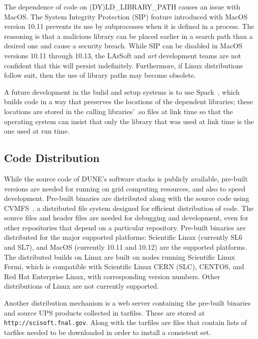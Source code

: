 The dependence of code on (DY)LD\_LIBRARY\_PATH causes an issue with MacOS.  The System Integrity Protection (SIP)
feature introduced with MacOS version 10.11 prevents its use by subprocesses when it is defined in a process.
The reasoning is that a malicious library can be placed earlier in a search path than a desired one and
cause a security breach.  While SIP can be disabled in MacOS versions 10.11 through 10.13, the LArSoft and
{\it art} development teams are not confident that this will persist indefinitely.  Furthermore, if Linux
distributions follow suit, then the use of library paths may become obsolete.

A future development in the bulid and setup systems is to use Spack~\cite{ref:spack}, which builds code in
a way that preserves the locations of the dependent libraries; these locations are stored in the calling
libraries' .so files at link time so that the operating system can insist that only the library that was used
at link time is the one used at run time.

\subsection{Code Distribution}

While the source code of DUNE's software stacks is publicly available, pre-built versions are needed
for running on grid computing resources, and also to speed development.  Pre-built binaries are distributed
along with the source code using CVMFS~\cite{ref:cvmfs}, a distributed file system designed for efficient
distribution of code.  The source files and header files are needed for debugging and development,
even for other repositories that depend on a particular repository.  Pre-built binaries are distributed
for the major supported platforms:  Scientific Linux (currently SL6 and SL7), and MacOS (currently 10.11
and 10.12) are the supported platforms.  The distributed builds on Linux are built on nodes running
Scientific Linux Fermi, which is compatible with Scientific Linux CERN (SLC), CENTOS, and Red Hat Enterprise
Linux, with corresponding version numbers.  Other distributions of Linux are not currently supported.

Another distribution mechanism is a web server containing the pre-built binaries and source UPS products
collected in tarfiles.  These are stored at {\tt http://scisoft.fnal.gov}.  Along with the tarfiles are
files that contain lists of tarfiles needed to be downloaded in order to install a consistent set.

